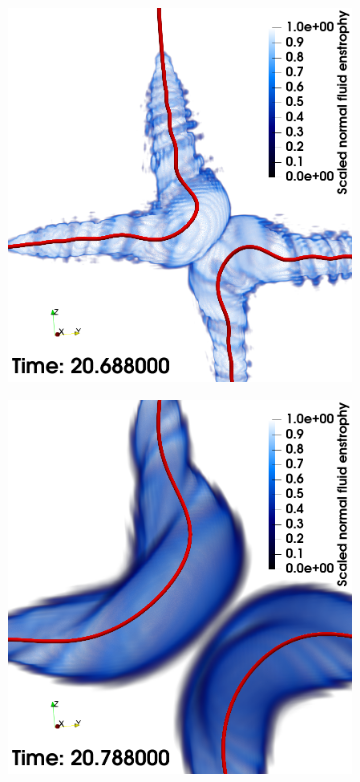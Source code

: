 \documentclass[%
 reprint,
 amsmath,amssymb,
 aps,
 prl,
]{revtex4-2}
\begin{document}
\begin{figure}
\begin{subfigure}[b]{0.24\textwidth}
	\end{subfigure}
    \begin{subfigure}[b]{0.24\textwidth}
		\centering
		\includegraphics*[width=\textwidth]{snap-3.png}
	\end{subfigure}
    \begin{subfigure}[b]{0.24\textwidth}
		\centering
		\includegraphics*[width=\textwidth]{snap-4.png}

\end{subfigure}
\end{figure}
\end{document}
